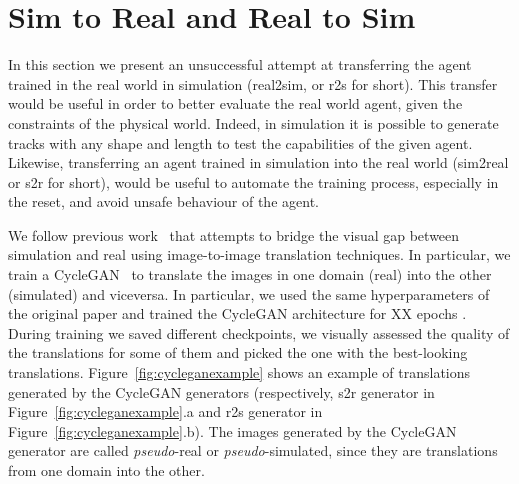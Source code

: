 \section{Sim to Real and Real to Sim}

In this section we present an unsuccessful attempt at transferring the agent trained in the real world in simulation (real2sim, or r2s for short). This transfer would be useful in order to better evaluate the real world agent, given the constraints of the physical world. Indeed, in simulation it is possible to generate tracks with any shape and length to test the capabilities of the given agent. Likewise, transferring an agent trained in simulation into the real world (sim2real or s2r for short), would be useful to automate the training process, especially in the reset, and avoid unsafe behaviour of the agent.



We follow previous work~\cite{stocco-mind} that attempts to bridge the visual gap between simulation and real using image-to-image translation techniques. In particular, we train a CycleGAN~\cite{CycleGAN2017} to translate the images in one domain (real) into the other (simulated) and viceversa. In particular, we used the same hyperparameters of the original paper and trained the CycleGAN architecture for XX epochs . During training we saved different checkpoints, we visually assessed the quality of the translations for some of them and picked the one with the best-looking translations. Figure~\ref{fig:cycleganexample} shows an example of translations generated by the CycleGAN generators (respectively, s2r generator in Figure~\ref{fig:cycleganexample}.a and r2s generator in Figure~\ref{fig:cycleganexample}.b). The images generated by the CycleGAN generator are called \textit{pseudo}-real or \textit{pseudo}-simulated, since they are translations from one domain into the other.

